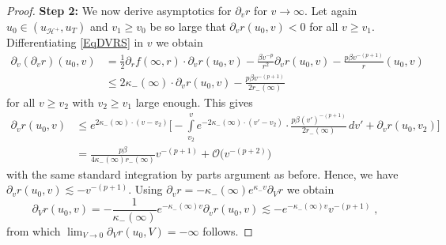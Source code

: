 \documentclass[reqno]{article}
\newcommand{\uh}{u_{\mathcal{H}^+}}
\newcommand{\rd}{\partial}
\begin{document}
\begin{proof}
\textbf{Step 2:} We now derive asymptotics for $\rd_v r$ for $v \to \infty$. Let again $u_0 \in (\uh, u_T)$ and  $v_1 \geq v_0$ be so large that $\rd_v r (u_0, v) < 0$ for all $v \geq v_1$. Differentiating \eqref{EqDVRS} in $v$ we obtain
\begin{equation} \label{EqDVVR}
\begin{split}
\rd_v(\rd_v r) (u_0, v)&= \frac{1}{2} \rd_rf(\infty, r) \cdot \rd_v r (u_0, v)- \frac{\beta v^{-p}}{r^2} \rd_v r (u_0, v)- \frac{p \beta v^{-(p+1)}}{r} (u_0,v) \\
&\leq 2 \kappa_-(\infty) \cdot \rd_v r (u_0,v) - \frac{p \beta v^{-(p+1)}}{2r_-(\infty)}
\end{split}
\end{equation}
for all $v \geq v_2 $ with $v_2 \geq v_1$ large enough. This gives
\begin{equation*}
\begin{split}
\rd_v r(u_0, v) &\leq e^{2 \kappa_-(\infty)\cdot (v - v_2)} \Big[ - \int\limits_{v_2}^v e^{- 2 \kappa_-(\infty) \cdot (v' - v_2)} \cdot \frac{ p \beta (v')^{-(p+1)}}{2r_-(\infty)} \, dv' + \rd_vr(u_0, v_2)\Big] \\
&= \frac{p \beta}{4 \kappa_-(\infty) r_-(\infty)} v^{-(p+1)} + \mathcal{O}\big( v^{-(p+2)}\big) 
\end{split}
\end{equation*}
with the same standard integration by parts argument as before. Hence, we have $\rd_v r(u_0, v) \lesssim - v^{-(p+1)}$. Using $\rd_v r = - \kappa_-(\infty) e^{\kappa_- v} \rd_V r$ we obtain $$\rd_V r (u_0, v) = - \frac{1}{\kappa_-(\infty)} e^{-\kappa_-(\infty) v} \rd_v r(u_0,v) \lesssim - e^{-\kappa_-(\infty)v } v^{-(p+1)}\;,$$
from which $\lim_{V \to 0} \partial_V r (u_0,V) = -\infty$ follows.


\end{proof}
\end{document}
